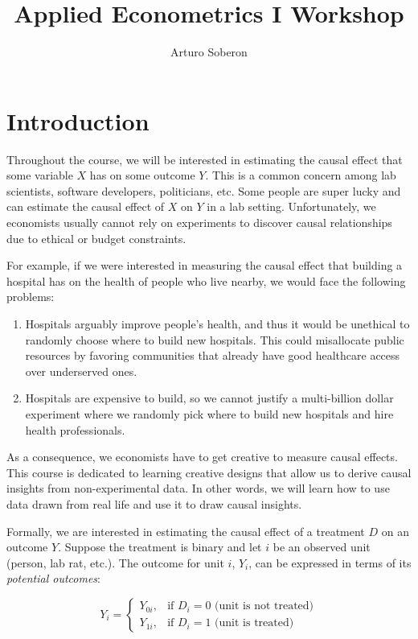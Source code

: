 \documentclass[12pt]{article}
\begin{document}
\title{Applied Econometrics I Workshop}
\author{Arturo Soberon}
\date{}
\maketitle

\setcounter{section}{0}
\section{Introduction}
Throughout the course, we will be interested in estimating the causal effect that some
variable $X$ has on some outcome $Y$. This is a common concern among lab scientists,
software developers, politicians, etc. Some people are super lucky and can estimate the
causal effect of $X$ on $Y$ in a lab setting. Unfortunately, we economists usually
cannot rely on experiments to discover causal relationships due to ethical or budget
constraints.

For example, if we were interested in measuring the causal effect that building a
hospital has on the health of people who live nearby, we would face the following
problems:
\begin{enumerate}
    \item Hospitals arguably improve people's health, and thus it would be unethical to
    randomly choose where to build new hospitals. This could misallocate public
    resources by favoring communities that already have good healthcare access over
    underserved ones.
    \item Hospitals are expensive to build, so we cannot justify a multi-billion
    dollar experiment where we randomly pick where to build new hospitals and hire
    health professionals.
\end{enumerate}

As a consequence, we economists have to get creative to measure causal effects. This
course is dedicated to learning creative designs that allow us to derive causal insights
from non-experimental data. In other words, we will learn how to use data drawn from
real life and use it to draw causal insights.

Formally, we are interested in estimating the causal effect of a treatment $D$ on an
outcome $Y$. Suppose the treatment is binary and let $i$ be an observed unit (person,
lab rat, etc.). The outcome for unit $i$, $Y_i$, can be expressed in terms of its
\textit{potential outcomes}:

\begin{equation}
    Y_i =
    \begin{cases}
        Y_{0i}, & \text{if } D_i = 0 \text{ (unit is not treated)} \\
        Y_{1i}, & \text{if } D_i = 1 \text{ (unit is treated)}
    \end{cases}
\end{equation}
\end{document}
